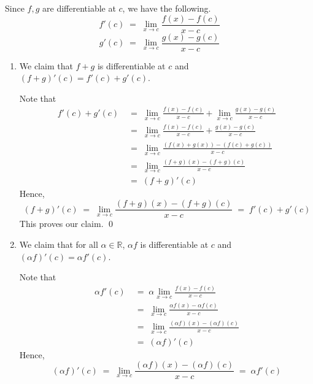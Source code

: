 \documentclass[10pt]{article}
\begin{document}
        Since $f, g$ are differentiable at $c$, we have the following.
        \[f'(c) \;=\; \lim_{x \to c} \frac{f(x) - f(c)}{x - c}\]
        \[g'(c) \;=\; \lim_{x \to c} \frac{g(x) - g(c)}{x - c}\]
        \begin{enumerate}
                \item We claim that $f + g$ is differentiable at $c$ and $(f + g)'(c) = f'(c) + g'(c)$.

                Note that
                \begin{align*}
                        f'(c) + g'(c) \;&=\; \lim_{x \to c} \frac{f(x) - f(c)}{x - c} + \lim_{x \to c} \frac{g(x) - g(c)}{x - c} \\
                                \;&=\; \lim_{x \to c} \frac{f(x) - f(c)}{x - c} + \frac{g(x) - g(c)}{x - c} \\
                                \;&=\; \lim_{x \to c} \frac{(f(x) + g(x)) - (f(c) + g(c))}{x - c} \\
                                \;&=\; \lim_{x \to c} \frac{(f + g)(x) - (f + g)(c)}{x - c} \\
                                \;&=\; (f + g)'(c)
                \end{align*}
                Hence,
                \[
                (f + g)'(c) \;=\; \lim_{x \to c} \frac{(f + g)(x) - (f + g)(c)}{x - c} \;=\; f'(c) + g'(c)
                \]
                This proves our claim. \qed

                \item We claim that for all $\alpha \in \mathbb{R}$, $\alpha f$ is differentiable at $c$ and $(\alpha f)'(c) = \alpha f'(c)$.

                Note that
                \begin{align*}
                \alpha f'(c) \;&=\; \alpha \lim_{x \to c} \frac{f(x) - f(c)}{x - c} \\
                        \;&=\; \lim_{x \to c} \frac{\alpha f(x) - \alpha f(c)}{x - c} \\
                        \;&=\; \lim_{x \to c} \frac{(\alpha f)(x) - (\alpha f)(c)}{x - c} \\
                        \;&=\; (\alpha f)'(c)
                \end{align*}
                Hence,
                \[
                (\alpha f)'(c) \;=\; \lim_{x \to c} \frac{(\alpha f)(x) - (\alpha f)(c)}{x - c} \;=\; \alpha f'(c)
                \]


\end{enumerate}
\end{document}
